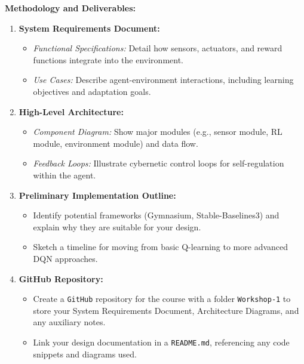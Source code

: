 \documentclass[doc]{apa6}
\begin{document}
\newpage
\noindent \textbf{Methodology and Deliverables:}
\begin{enumerate}
    \item \textbf{System Requirements Document:}
    \begin{itemize}
        \item \textit{Functional Specifications:} Detail how sensors, actuators, and 
                reward functions integrate into the environment.
        \item \textit{Use Cases:} Describe agent-environment interactions, including 
                learning objectives and adaptation goals.
    \end{itemize}

    \item \textbf{High-Level Architecture:}
    \begin{itemize}
        \item \textit{Component Diagram:} Show major modules (e.g., sensor module, RL 
            module, environment module) and data flow.
        \item \textit{Feedback Loops:} Illustrate cybernetic control loops for 
            self-regulation within the agent.
    \end{itemize}

    \item \textbf{Preliminary Implementation Outline:}
    \begin{itemize}
        \item Identify potential frameworks (Gymnasium, Stable-Baselines3) and explain 
                why they are suitable for your design.
        \item Sketch a timeline for moving from basic Q-learning to more advanced DQN 
                approaches.
    \end{itemize}

    \item \textbf{GitHub Repository:}
    \begin{itemize}
        \item Create a  \texttt{GitHub} repository for the course with a folder 
                \texttt{Workshop-1} to store your System Requirements Document, 
                Architecture Diagrams, and any auxiliary notes.
        \item Link your design documentation in a \texttt{README.md}, referencing any 
                code snippets and diagrams used.
    \end{itemize}
\end{enumerate}
\end{document}
